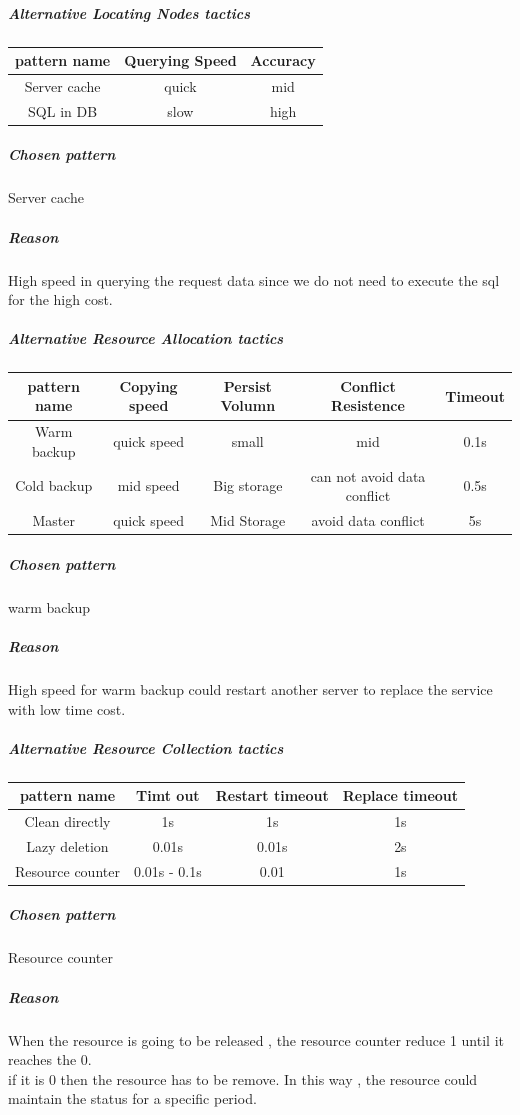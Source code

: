 \documentclass{article}
\begin{document}
					\subparagraph{Alternative Locating Nodes tactics}
					\begin{center}
						\begin{tabular}{|c|c|c|}
							\hline
							pattern name & Querying Speed & Accuracy\\
							\hline
							Server cache & quick & mid\\
							\hline
							SQL in DB & slow & high\\
							\hline
						\end{tabular}
					\end{center}
					\subparagraph{Chosen pattern} 
					Server cache
					\subparagraph{Reason} 
					High speed in querying the request data since we do not need to execute the sql for the high cost.

					\subparagraph{Alternative Resource Allocation tactics}
					\begin{center}
						\begin{tabular}{|c|c|c|c|c|}
							\hline
							pattern name & Copying speed & Persist Volumn & Conflict Resistence & Timeout\\
							\hline
							Warm backup & quick speed & small & mid & 0.1s\\
							\hline
							Cold backup & mid speed & Big storage & can not avoid data conflict & 0.5s\\
							\hline
							Master	& quick speed & Mid Storage & avoid data conflict & 5s\\
							\hline
						\end{tabular}
					\end{center}
					\subparagraph{Chosen pattern} 
					warm backup
					\subparagraph{Reason} 
					High speed for warm backup could restart another server to replace the service with low time cost.

					\subparagraph{Alternative Resource Collection tactics}
					\begin{center}
						\begin{tabular}{|c|c|c|c|}
							\hline
							pattern name & Timt out & Restart timeout & Replace timeout\\
							\hline
							Clean directly & 1s & 1s & 1s\\
							\hline
							Lazy deletion & 0.01s & 0.01s & 2s\\
							\hline
							Resource counter & 0.01s - 0.1s & 0.01 & 1s \\
							\hline
						\end{tabular}
					\end{center}
					\subparagraph{Chosen pattern} 
					Resource counter
					\subparagraph{Reason} 
					When the resource is going to be released , the resource counter reduce 1 until it reaches the 0.\\
					if it is 0 then the resource has to be remove. In this way , the resource could maintain the status for a specific period.
				
\end{document}
